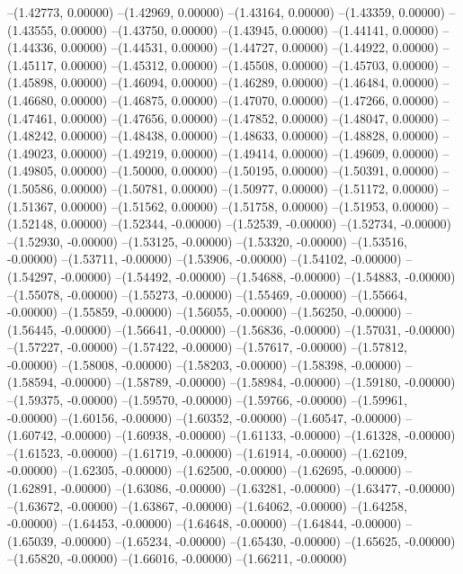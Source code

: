 --(1.42773, 0.00000)
--(1.42969, 0.00000)
--(1.43164, 0.00000)
--(1.43359, 0.00000)
--(1.43555, 0.00000)
--(1.43750, 0.00000)
--(1.43945, 0.00000)
--(1.44141, 0.00000)
--(1.44336, 0.00000)
--(1.44531, 0.00000)
--(1.44727, 0.00000)
--(1.44922, 0.00000)
--(1.45117, 0.00000)
--(1.45312, 0.00000)
--(1.45508, 0.00000)
--(1.45703, 0.00000)
--(1.45898, 0.00000)
--(1.46094, 0.00000)
--(1.46289, 0.00000)
--(1.46484, 0.00000)
--(1.46680, 0.00000)
--(1.46875, 0.00000)
--(1.47070, 0.00000)
--(1.47266, 0.00000)
--(1.47461, 0.00000)
--(1.47656, 0.00000)
--(1.47852, 0.00000)
--(1.48047, 0.00000)
--(1.48242, 0.00000)
--(1.48438, 0.00000)
--(1.48633, 0.00000)
--(1.48828, 0.00000)
--(1.49023, 0.00000)
--(1.49219, 0.00000)
--(1.49414, 0.00000)
--(1.49609, 0.00000)
--(1.49805, 0.00000)
--(1.50000, 0.00000)
--(1.50195, 0.00000)
--(1.50391, 0.00000)
--(1.50586, 0.00000)
--(1.50781, 0.00000)
--(1.50977, 0.00000)
--(1.51172, 0.00000)
--(1.51367, 0.00000)
--(1.51562, 0.00000)
--(1.51758, 0.00000)
--(1.51953, 0.00000)
--(1.52148, 0.00000)
--(1.52344, -0.00000)
--(1.52539, -0.00000)
--(1.52734, -0.00000)
--(1.52930, -0.00000)
--(1.53125, -0.00000)
--(1.53320, -0.00000)
--(1.53516, -0.00000)
--(1.53711, -0.00000)
--(1.53906, -0.00000)
--(1.54102, -0.00000)
--(1.54297, -0.00000)
--(1.54492, -0.00000)
--(1.54688, -0.00000)
--(1.54883, -0.00000)
--(1.55078, -0.00000)
--(1.55273, -0.00000)
--(1.55469, -0.00000)
--(1.55664, -0.00000)
--(1.55859, -0.00000)
--(1.56055, -0.00000)
--(1.56250, -0.00000)
--(1.56445, -0.00000)
--(1.56641, -0.00000)
--(1.56836, -0.00000)
--(1.57031, -0.00000)
--(1.57227, -0.00000)
--(1.57422, -0.00000)
--(1.57617, -0.00000)
--(1.57812, -0.00000)
--(1.58008, -0.00000)
--(1.58203, -0.00000)
--(1.58398, -0.00000)
--(1.58594, -0.00000)
--(1.58789, -0.00000)
--(1.58984, -0.00000)
--(1.59180, -0.00000)
--(1.59375, -0.00000)
--(1.59570, -0.00000)
--(1.59766, -0.00000)
--(1.59961, -0.00000)
--(1.60156, -0.00000)
--(1.60352, -0.00000)
--(1.60547, -0.00000)
--(1.60742, -0.00000)
--(1.60938, -0.00000)
--(1.61133, -0.00000)
--(1.61328, -0.00000)
--(1.61523, -0.00000)
--(1.61719, -0.00000)
--(1.61914, -0.00000)
--(1.62109, -0.00000)
--(1.62305, -0.00000)
--(1.62500, -0.00000)
--(1.62695, -0.00000)
--(1.62891, -0.00000)
--(1.63086, -0.00000)
--(1.63281, -0.00000)
--(1.63477, -0.00000)
--(1.63672, -0.00000)
--(1.63867, -0.00000)
--(1.64062, -0.00000)
--(1.64258, -0.00000)
--(1.64453, -0.00000)
--(1.64648, -0.00000)
--(1.64844, -0.00000)
--(1.65039, -0.00000)
--(1.65234, -0.00000)
--(1.65430, -0.00000)
--(1.65625, -0.00000)
--(1.65820, -0.00000)
--(1.66016, -0.00000)
--(1.66211, -0.00000)
